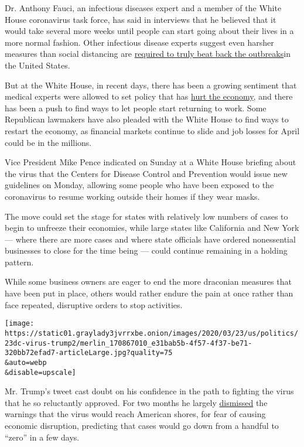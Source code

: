 Dr. Anthony Fauci, an infectious diseases expert and a member of the
White House coronavirus task force, has said in interviews that he
believed that it would take several more weeks until people can start
going about their lives in a more normal fashion. Other infectious
disease experts suggest even harsher measures than social distancing are
\href{https://www.nytimes3xbfgragh.onion/2020/03/22/health/coronavirus-restrictions-us.html}{required
to truly beat back the outbreaks}in the United States.

But at the White House, in recent days, there has been a growing
sentiment that medical experts were allowed to set policy that has
\href{https://www.nytimes3xbfgragh.onion/2020/03/21/business/economy/coronavirus-recession.html}{hurt
the economy}, and there has been a push to find ways to let people start
returning to work. Some Republican lawmakers have also pleaded with the
White House to find ways to restart the economy, as financial markets
continue to slide and job losses for April could be in the millions.

Vice President Mike Pence indicated on Sunday at a White House briefing
about the virus that the Centers for Disease Control and Prevention
would issue new guidelines on Monday, allowing some people who have been
exposed to the coronavirus to resume working outside their homes if they
wear masks.

The move could set the stage for states with relatively low numbers of
cases to begin to unfreeze their economies, while large states like
California and New York --- where there are more cases and where state
officials have ordered nonessential businesses to close for the time
being --- could continue remaining in a holding pattern.

While some business owners are eager to end the more draconian measures
that have been put in place, others would rather endure the pain at once
rather than face repeated, disruptive orders to stop activities.

\texttt{[image: https://static01.graylady3jvrrxbe.onion/images/2020/03/23/us/politics/23dc-virus-trump2/merlin\_170867010\_e31bab5b-4f57-4f37-be71-320bb72efad7-articleLarge.jpg?quality=75\\\&auto=webp\\\&disable=upscale]}

Mr. Trump's tweet cast doubt on his confidence in the path to fighting
the virus that he so reluctantly approved. For two months he largely
\href{https://www.nytimes3xbfgragh.onion/interactive/2020/03/18/us/trump-coronavirus-statements-timeline.html}{dismissed}
the warnings that the virus would reach American shores, for fear of
causing economic disruption, predicting that cases would go down from a
handful to ``zero'' in a few days.

